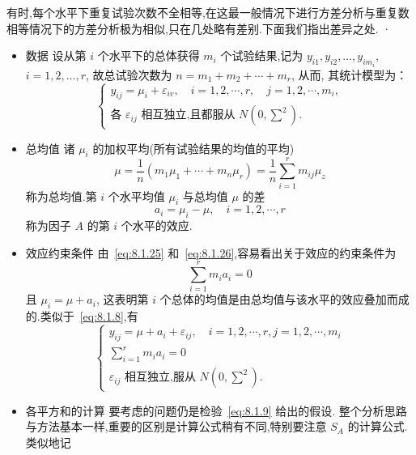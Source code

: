 有时,每个水平下重复试验次数不全相等,在这最一般情况下进行方差分析与重复数相等情况下的方差分析极为相似,只在几处略有差别.下面我们指出差异之处.
·
\begin{itemize}
  \item 数据
  设从第 $i$ 个水平下的总体获得 $m_i$ 个试验结果,记为 $y_{i1}, y_{i2}, \ldots, y_{im_{i}}$, $i=1,2,\ldots,r$, 故总试验次数为 $n=m_1+m_2+\cdots+m_r$, 从而, 其统计模型为：
  \begin{equation}\label{eq:8.1.24}
    \begin{cases}
      y_{i j}=\mu_{i}+\varepsilon_{i v}, \quad i=1,2, \cdots, r, \quad j=1,2, \cdots, m_{i},\\
      \text{各 $\varepsilon_{ij}$ 相互独立,且都服从 $N(0,\sum^2)$}.
    \end{cases}
  \end{equation}
  \item 总均值
  诸 $\mu_i$ 的加权平均(所有试验结果的均值的平均)
  \begin{equation}\label{eq:8.1.25}
    \mu=\frac{1}{n}\left(m_{1} \mu_{1}+\cdots+m_{n} \mu_{r}\right)=\frac{1}{n} \sum_{i=1}^{r} m_{i j} \mu_{z}
  \end{equation}
  称为总均值.第 $i$ 个水平均值 $\mu_i$ 与总均值 $\mu$ 的差
  \begin{equation}\label{eq:8.1.26}
    a_{i}=\mu_{i}-\mu, \quad i=1,2, \cdots, r
  \end{equation}
  称为因子 $A$ 的第 $i$ 个水平的效应.
  \item 效应约束条件
  由~\eqref{eq:8.1.25} 和~\eqref{eq:8.1.26},容易看出关于效应的约束条件为
  \begin{equation*}
    \sum_{i=1}^{r} m_{i} a_{i}=0
  \end{equation*}
  且 $\mu_i = \mu + a_i$, 这表明第 $i$ 个总体的均值是由总均值与该水平的效应叠加而成的.类似于~\eqref{eq:8.1.8},有
  \begin{equation}\label{eq:8.1.27}
    \begin{cases}
      y_{i j}=\mu+a_{i}+\varepsilon_{i j}, \quad i=1,2, \cdots, r, j=1,2, \cdots, m_{i}\\
      \sum_{i=1}^{r} m_{i} a_{i}=0\\
      \text{$\varepsilon_{ij}$ 相互独立,服从 $N(0,\sum^2)$}.
    \end{cases}
  \end{equation}
  \item 各平方和的计算
  要考虑的问题仍是检验~\eqref{eq:8.1.9} 给出的假设. 整个分析思路与方法基本一样,重要的区别是计算公式稍有不同,特别要注意 $S_A$ 的计算公式. 类似地记

\end{itemize}
